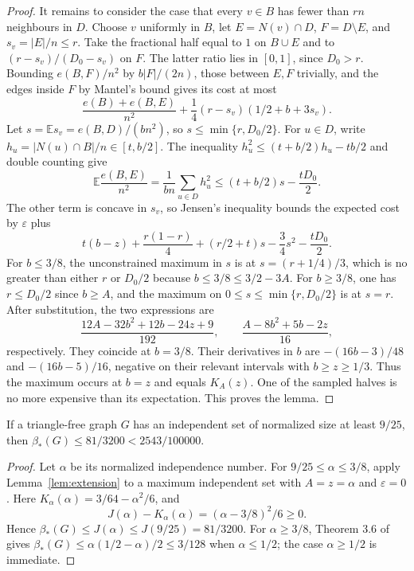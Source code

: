 \documentclass[12pt]{article}
\newcommand{\B}{\beta_*}
\newcommand{\E}{\mathbb E}
\begin{document}
\begin{proof}
It remains to consider the case that every $v\in B$ has fewer than
$rn$ neighbours in $D$. Choose $v$ uniformly in $B$, let
$E=N(v)\cap D$, $F=D\setminus E$, and $s_v=|E|/n\le r$.
Take the fractional half equal to $1$ on $B\cup E$ and to
$(r-s_v)/(D_0-s_v)$ on $F$. The latter ratio lies in $[0,1]$,
since $D_0>r$. Bounding $e(B,F)/n^2$ by $b|F|/(2n)$,
those between $E,F$ trivially, and the edges inside $F$ by Mantel's
bound gives its cost at most
\[
 \frac{e(B)+e(B,E)}{n^2}
 +\frac14(r-s_v)(1/2+b+3s_v).
\]
Let $s=\E s_v=e(B,D)/(bn^2)$, so $s\le\min\{r,D_0/2\}$.
For $u\in D$, write $h_u=|N(u)\cap B|/n\in[t,b/2]$.
The inequality $h_u^2\le(t+b/2)h_u-tb/2$ and double counting give
\[
 \E\frac{e(B,E)}{n^2}
 =\frac1{bn}\sum_{u\in D}h_u^2
 \le(t+b/2)s-\frac{tD_0}{2}.
\]
The other term is concave in $s_v$, so Jensen's inequality bounds the
expected cost by $\varepsilon$ plus
\begin{equation}\label{eq:extension-quadratic}
 t(b-z)+\frac{r(1-r)}4+(r/2+t)s-\frac34s^2-\frac{tD_0}{2}.
\end{equation}
For $b\le3/8$, the unconstrained maximum in $s$ is at
$s=(r+1/4)/3$, which is no greater than either $r$ or $D_0/2$
because $b\le3/8\le3/2-3A$. For $b\ge3/8$, one has
$r\le D_0/2$ since $b\ge A$, and the maximum on
$0\le s\le\min\{r,D_0/2\}$ is at $s=r$.
After substitution, the two expressions are
\[
 \frac{12A-32b^2+12b-24z+9}{192},\qquad
 \frac{A-8b^2+5b-2z}{16},
\]
respectively. They coincide at $b=3/8$. Their derivatives in $b$ are
$-(16b-3)/48$ and $-(16b-5)/16$, negative on their relevant intervals
with $b\ge z\ge1/3$. Thus the maximum occurs at $b=z$ and equals
$K_A(z)$. One of the sampled halves is no more expensive than its
expectation. This proves the lemma.
\end{proof}

\begin{lemma}\label{lem:independence}
If a triangle-free graph $G$ has an independent set of normalized size at least $9/25$,
then $\B(G)\le81/3200<2543/100000$.
\end{lemma}
\begin{proof}
Let $\alpha$ be its normalized independence number. For
$9/25\le\alpha\le3/8$, apply Lemma~\ref{lem:extension} to a maximum
independent set with $A=z=\alpha$ and $\varepsilon=0$.
Here $K_\alpha(\alpha)=3/64-\alpha^2/6$, and
\[
 J(\alpha)-K_\alpha(\alpha)=(\alpha-3/8)^2/6\ge0.
\]
Hence $\B(G)\le J(\alpha)\le J(9/25)=81/3200$.
For $\alpha\ge3/8$, Theorem 3.6 of \cite{razborov} gives
$\B(G)\le\alpha(1/2-\alpha)/2\le3/128$ when
$\alpha\le1/2$; the case $\alpha\ge1/2$ is immediate.
\end{proof}
\end{document}
